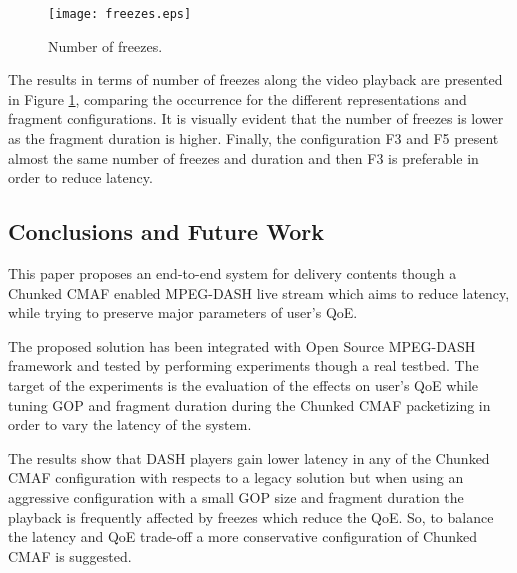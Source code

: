 \begin{figure}[htp]
	\centering
	\texttt{[image: freezes.eps]}
	\caption{Number of freezes.}
	\label{fig:BMSB2019freezes}
\end{figure}

The results in terms of number of freezes along the video playback are presented in Figure \ref{fig:BMSB2019freezes}, comparing the occurrence for the different representations and fragment configurations. It is visually evident that the number of freezes is lower as the fragment duration is higher. Finally, the configuration F3 and F5 present almost the same number of freezes and duration and then F3 is preferable in order to reduce latency.

\subsection{Conclusions and Future Work}
\label{sec:BMSB2019conlusion}
This paper proposes an end-to-end system for delivery contents though a Chunked CMAF enabled MPEG-DASH live stream which aims to reduce latency, while trying to preserve major parameters of user's QoE.

The proposed solution has been integrated with Open Source MPEG-DASH framework and tested by performing experiments though a real testbed. The target of the experiments is the evaluation of the effects on user's QoE while tuning GOP and fragment duration during the Chunked CMAF packetizing in order to vary the latency of the system.

The results show that DASH players gain lower latency in any of the Chunked CMAF configuration with respects to a legacy solution but when using an aggressive configuration with a small GOP size and fragment duration the playback is frequently affected by freezes which reduce the QoE. So, to balance the latency and QoE trade-off a more conservative configuration of Chunked CMAF is suggested.







